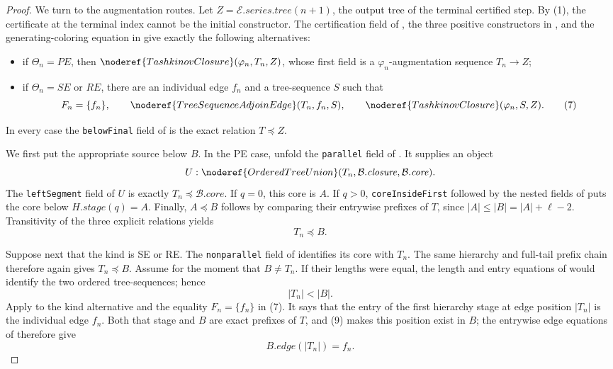 \begin{proof}
We turn to the augmentation routes.  Let
\(Z=\mathcal E.\mathit{series}.\mathit{tree}(n+1)\), the output tree of
the terminal certified step.  By (1), the certificate at the terminal
index cannot be the initial constructor.  The certification field of
, the three positive constructors in
, and the generating-coloring equation in
 give exactly the following alternatives:
\begin{itemize}
\item if \(\Theta_n=PE\), then
\(\noderef{TashkinovClosure}(\varphi_n,T_n,Z)\), whose first field is a
\(\varphi_n\)-augmentation sequence \(T_n\longrightarrow Z\);
\item if \(\Theta_n=SE\) or \(RE\), there are an individual edge \(f_n\)
and a tree-sequence \(S\) such that
\[
 F_n=\{f_n\},\qquad
 \noderef{TreeSequenceAdjoinEdge}(T_n,f_n,S),\qquad
 \noderef{TashkinovClosure}(\varphi_n,S,Z).                  \tag{7}
\]
\end{itemize}
In every case the \texttt{belowFinal} field of
 is the exact relation \(T\preccurlyeq Z\).

We first put the appropriate source below \(B\).  In the PE case, unfold
the \texttt{parallel} field of .  It supplies an
object
\[
 U:\noderef{OrderedTreeUnion}(T_n,\mathcal B.\mathit{closure},
                              \mathcal B.\mathit{core}).
\]
The \texttt{leftSegment} field of \(U\) is exactly
\(T_n\preccurlyeq\mathcal B.\mathit{core}\).  If \(q=0\), this core is
\(A\).  If \(q>0\), \texttt{coreInsideFirst} followed by the nested fields
of  puts the core below
\(H.\mathit{stage}(q)=A\).  Finally, \(A\preccurlyeq B\) follows by
comparing their entrywise prefixes of \(T\), since
\(|A|\leq|B|=|A|+\ell-2\).  Transitivity of the three explicit
 relations yields
\[
                         T_n\preccurlyeq B.                   \tag{8}
\]

Suppose next that the kind is SE or RE.  The \texttt{nonparallel} field
of  identifies its core with \(T_n\).  The same
hierarchy and full-tail prefix chain therefore again gives
\(T_n\preccurlyeq B\).  Assume for the moment that \(B\ne T_n\).  If
their lengths were equal, the length and entry equations of
 would identify the two ordered
tree-sequences; hence
\[
                         |T_n|<|B|.                           \tag{9}
\]
Apply  to the kind alternative
and the equality \(F_n=\{f_n\}\) in (7).  It says that the entry of the
first hierarchy stage at edge position \(|T_n|\) is the individual edge
\(f_n\).  Both that stage and \(B\) are exact prefixes of \(T\), and (9)
makes this position exist in \(B\); the entrywise edge equations of
 therefore give
\[
                    B.\mathit{edge}(|T_n|)=f_n.              \tag{10}
\]


\end{proof}
